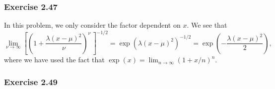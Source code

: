 \documentclass[12pt, a4paper]{article}
\begin{document}
\subsubsection*{Exercise 2.47}
In this problem, we only consider the factor dependent on $x$.
We see that 
\begin{equation*}
\lim_{\nu \to \infty}
	\left[ 
	\left( 1 + \frac{\lambda (x - \mu)^2}{\nu} \right)^{\nu} \, \right]^{-1/2}
	= \exp\left( \lambda (x - \mu)^2 \right)^{-1/2}
	= \exp\left( - \frac{\lambda (x - \mu)^2}{2} \right),
\end{equation*}
where we have used the fact that  $\exp(x) = \lim_{n\to\infty}\left(1 + x / n\right)^{n}$.

\subsubsection*{Exercise 2.49}
\end{document}
